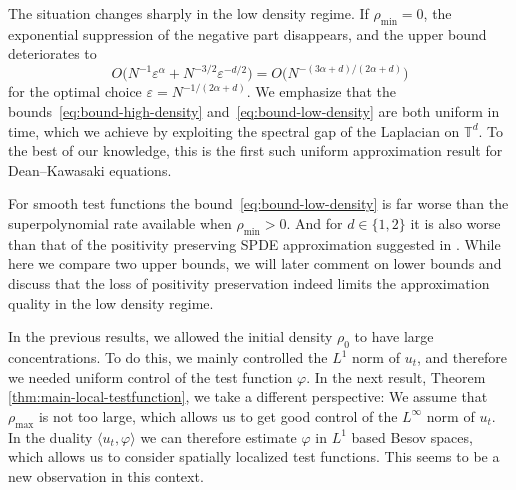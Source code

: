 \documentclass[a4paper,12pt]{article}
\begin{document}
The situation changes sharply in the low density regime. If $\rho_{\min} = 0$, the exponential suppression of the negative part disappears, and the upper bound deteriorates to
\begin{equation}\label{eq:bound-low-density}
  O\!\bigl(N^{-1}\varepsilon^\alpha + N^{-3/2}\varepsilon^{-d/2}\bigr)
  =
  O\!\bigl(N^{-(3\alpha + d)/(2\alpha+d)}\bigr) 
\end{equation}
for the optimal choice $\varepsilon = N^{-1/(2\alpha+d)}$. We emphasize that the bounds~\eqref{eq:bound-high-density} and~\eqref{eq:bound-low-density} are both uniform in time, which we achieve by exploiting the spectral gap of the Laplacian on $\mathbb T^d$. To the best of our knowledge, this is the first such uniform approximation result for Dean--Kawasaki equations.

For smooth test functions the bound~\eqref{eq:bound-low-density} is far worse than the superpolynomial rate available when $\rho_{\min}>0$. And for $d \in \{1,2\}$ it is also worse than that of the positivity preserving SPDE approximation suggested in \cite{Djurdjevac2024}. While here we compare two upper bounds, we will later comment on lower bounds and discuss that the loss of positivity preservation indeed limits the approximation quality in the low density regime.

In the previous results, we allowed the initial density $\rho_0$ to have large concentrations.
To do this, we mainly controlled the $L^1$ norm of $u_t$, and therefore we needed uniform control of the test function $\varphi$. In the next result, Theorem \ref{thm:main-local-testfunction}, we take a different perspective: We assume that $\rho_{\max}$ is not too large, which allows us to get good control of the $L^\infty$ norm of $u_t$. In the duality $\langle u_t, \varphi\rangle$ we can therefore estimate $\varphi$ in $L^1$ based Besov spaces, which allows us to consider spatially localized test functions. This seems to be a new observation in this context.
\end{document}
